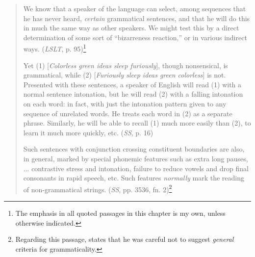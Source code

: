  \begin{quote}
We know that a speaker of the language can select, among sequences that he has never heard,  \textit{certain} grammatical sentences, and that he will do this in much the same way as other speakers. We might test this by a direct determination of some sort of ``bizarreness reaction,'' or in various indirect ways. (\textit{LSLT}, p. 95)\footnote{The emphasis in all quoted passages in this chapter is my own, unless otherwise indicated.
}



Yet (1) [\textit{Colorless green ideas sleep furiously}], though nonsensical, is grammatical, while (2) [\textit{Furiously sleep ideas green colorless}] is not.  Presented with these sentences, a speaker of English will read (1) with a normal sentence intonation, but he will read (2)  with a falling intonation on each word: in fact, with just the intonation pattern given to any sequence of unrelated words. He treats each word in (2)  as a separate phrase. Similarly, he will be able to recall (1) much more easily than (2), to learn it much more quickly, etc. (\textit{SS}, p. 16)

Such sentences with conjunction crossing constituent boundaries are also, in general, marked by special phonemic features such as extra long pauses, ... contrastive stress and intonation, failure to reduce vowels and drop final consonants in rapid speech, etc. Such features \textit{normally} mark the reading of non-grammatical strings. (\textit{SS}, pp. 35\textendash{}36, fn. 2)\footnote{Regarding this passage, \citet{Chomsky1961} states that he was careful not to suggest \textit{general} criteria for grammaticality.
}

 \end{quote}

